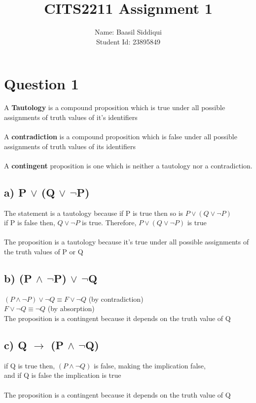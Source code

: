 \documentclass[11pt]{article}
\title{\textbf{CITS2211 Assignment 1}}
\author{Name: Baasil Siddiqui \\ Student Id: 23895849}
\date{}
\begin{document}
\parskip 2mm
\maketitle
\thispagestyle{fancy}

\section*{Question 1}
A \textbf{Tautology} is a compound proposition which is true under all possible
assignments of truth values of it's identifiers\\
\\
A \textbf{contradiction} is a compound proposition which is
false under all possible assignments of truth values of its identifiers\\
\\
A \textbf{contingent} proposition is one which is neither a tautology
nor a contradiction.
%
\subsection*{a) P $\lor$ (Q $\lor$ $\neg$P)}
The statement is a tautology because if P is true then so is $P \lor (Q \lor \neg P)$ \\
if P is false then, $Q \lor \neg P$ is true. Therefore, $P \lor (Q \lor \neg P)$ is true\\\\
The proposition is a tautology because it's true under all
possible assignments of the truth values of P or Q

\subsection*{b) (P $\land$ $\neg$P) $\lor$ $\neg$Q}

$(P \land \neg P) \lor \neg Q \equiv F \lor \neg Q$ (by contradiction) \\
$F \lor \neg Q \equiv \neg Q$ (by absorption) \\
\newline
The proposition is a contingent because it depends on the truth value of Q


\subsection*{c) Q $\rightarrow$ (P $\land$ $\neg$Q)}
if Q is true then, $(P \land \neg Q)$ is false, making the implication false, \\
and if Q is false the implication is true \\
\\
The proposition is a contingent because it depends on the truth value of Q
\end{document}

